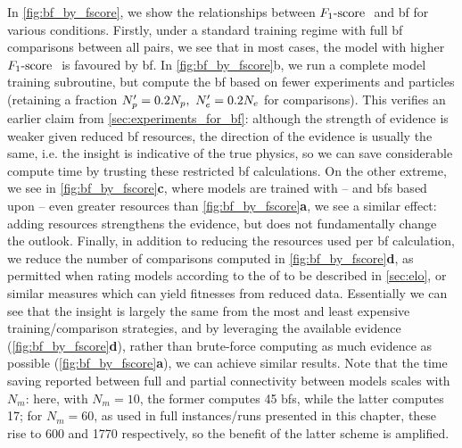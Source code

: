 In \cref{fig:bf_by_fscore}, we show the relationships between $ F_{1}\text{-score}  \ $ and \gls{bf} for various conditions. 
Firstly, under a standard training regime with full \gls{bf} comparisons between all pairs, 
    we see that in most cases, the model with higher $ F_{1}\text{-score}  \ $ is favoured by \gls{bf}.
In \cref{fig:bf_by_fscore}b, we run a complete model training subroutine, but compute the \gls{bf} based on fewer \glspl{experiment} and \glspl{particle} 
    (retaining a fraction $N_p^{\prime} = 0.2N_p, \ N_e^{\prime} = 0.2N_e$ for comparisons).
This verifies an earlier claim from \cref{sec:experiments_for_bf}: 
    although the strength of evidence is weaker given reduced \gls{bf} resources, 
    the direction of the evidence is usually the same, i.e. the insight is indicative of the true physics, 
    so we can save considerable compute time by trusting these restricted \gls{bf} calculations. 
On the other extreme, we see in \cref{fig:bf_by_fscore}\textbf{c}, where models are trained with
    -- and \glspl{bf} based upon -- even greater resources than \cref{fig:bf_by_fscore}\textbf{a}, we see a similar effect: 
    adding resources strengthens the evidence, but does not fundamentally change the outlook. 
Finally, in addition to reducing the resources used per \gls{bf} calculation, 
    we reduce the number of comparisons computed in \cref{fig:bf_by_fscore}\textbf{d}, 
    as permitted when rating models according to the \gls{of} to be described in \cref{sec:elo}, 
    or similar measures which can yield fitnesses from reduced data. 
Essentially we can see that the insight is largely the same 
    from the most and least expensive training/comparison strategies, 
    and by leveraging the available evidence (\cref{fig:bf_by_fscore}\textbf{d}), 
    rather than brute-force computing as much evidence as possible (\cref{fig:bf_by_fscore}\textbf{a}), 
    we can achieve similar results. 
Note that the time saving reported between full and partial connectivity between models scales with $N_m$: 
    here, with $N_m=10$, the former computes 45 \glspl{bf}, while the latter computes 17;
    for $N_m=60$, as used in full instances/runs presented in this chapter, these rise to 600 and 1770 respectively, 
    so the benefit of the latter scheme is amplified. 

